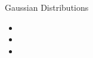 \begin{frame}
Gaussian Distributions
 \begin{itemize}
 \item
 \item
 \item
\end{itemize}
\end{frame}

